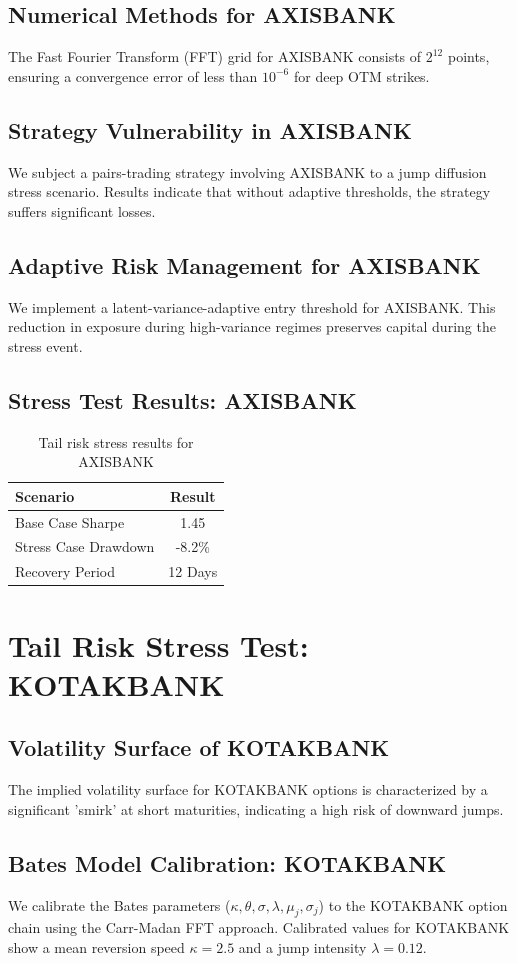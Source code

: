 \documentclass[12pt,a4paper,twoside]{article}
\begin{document}
\subsection{Numerical Methods for AXISBANK}
The Fast Fourier Transform (FFT) grid for AXISBANK consists of $2^{12}$ points, ensuring a convergence error of less than $10^{-6}$ for deep OTM strikes.
\subsection{Strategy Vulnerability in AXISBANK}
We subject a pairs-trading strategy involving AXISBANK to a jump diffusion stress scenario. Results indicate that without adaptive thresholds, the strategy suffers significant losses.
\subsection{Adaptive Risk Management for AXISBANK}
We implement a latent-variance-adaptive entry threshold for AXISBANK. This reduction in exposure during high-variance regimes preserves capital during the stress event.
\subsection{Stress Test Results: AXISBANK}
\begin{table}[H]
\centering
\begin{tabular}{|l|c|}
\hline
Scenario & Result \\
\hline
Base Case Sharpe & 1.45 \\
Stress Case Drawdown & -8.2\% \\
Recovery Period & 12 Days \\
\hline
\end{tabular}
\caption{Tail risk stress results for AXISBANK}
\end{table}
\newpage

\section{Tail Risk Stress Test: KOTAKBANK}
\subsection{Volatility Surface of KOTAKBANK}
The implied volatility surface for KOTAKBANK options is characterized by a significant 'smirk' at short maturities, indicating a high risk of downward jumps.
\subsection{Bates Model Calibration: KOTAKBANK}
We calibrate the Bates parameters ($\kappa, \theta, \sigma, \lambda, \mu_j, \sigma_j$) to the KOTAKBANK option chain using the Carr-Madan FFT approach.
Calibrated values for KOTAKBANK show a mean reversion speed $\kappa = 2.5$ and a jump intensity $\lambda = 0.12$.
\end{document}
